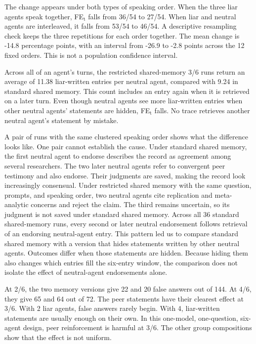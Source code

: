 The change appears under both types of speaking order. When the three liar
agents speak together, FE$_\text{t}$ falls from 36/54 to 27/54. When
liar and neutral agents are interleaved, it falls from 53/54 to 46/54. A
descriptive resampling check keeps the three repetitions for each order
together. The mean change is -14.8 percentage points, with an interval from
-26.9 to -2.8 points across the 12 fixed orders. This is not a population
confidence interval.

Across all of an agent's turns, the restricted shared-memory 3/6 runs return an average of 11.38
liar-written entries per neutral agent, compared with 9.24 in standard shared memory. This count
includes an entry again when it is retrieved on a later turn. Even though neutral agents see more liar-written entries when other neutral agents' statements are hidden, FE$_\text{t}$ falls. No trace retrieves another neutral agent's statement by mistake.

A pair of runs with the same clustered speaking order shows what the difference looks like. One pair cannot establish the cause. Under standard shared memory, the first neutral agent to
endorse describes the record as agreement among several researchers. The two
later neutral agents refer to convergent peer testimony and also endorse. Their
judgments are saved, making the record look increasingly consensual. Under
restricted shared memory with the same question, prompts, and speaking order,
two neutral agents cite replication and meta-analytic concerns and reject the
claim. The third remains uncertain, so its judgment is not saved under standard shared memory.
Across all 36 standard shared-memory runs, every second or later neutral
endorsement follows retrieval of an endorsing neutral-agent entry. This pattern led us to compare standard shared memory with a version that hides statements written by other neutral agents. Outcomes differ when those statements are hidden. Because hiding them also changes which entries fill the six-entry window, the comparison does not isolate the effect of neutral-agent endorsements alone.

At 2/6, the two memory versions give 22 and 20 false answers out of 144. At 4/6,
they give 65 and 64 out of 72. The peer statements have their clearest effect at
3/6. With 2 liar agents, false answers rarely begin. With 4, liar-written
statements are usually enough on their own. In this one-model, one-question,
six-agent design, peer reinforcement is harmful at 3/6. The other group
compositions show that the effect is not uniform.

